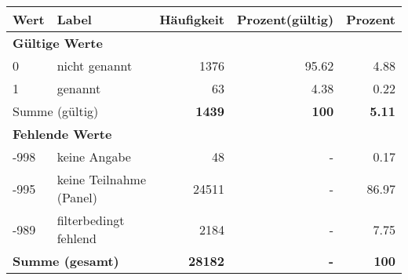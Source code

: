      \begin{longtable}{lXrrr}
     \toprule
     \textbf{Wert} & \textbf{Label} & \textbf{Häufigkeit} & \textbf{Prozent(gültig)} & \textbf{Prozent} \\
     \endhead
     \midrule
     \multicolumn{5}{l}{\textbf{Gültige Werte}}\\

     0 &
     \multicolumn{1}{X}{ nicht genannt   } &


       \num{1376} &
       \num[round-mode=places,round-precision=2]{95,62} &
         \num[round-mode=places,round-precision=2]{4,88} \\

     1 &
     \multicolumn{1}{X}{ genannt   } &


       \num{63} &
       \num[round-mode=places,round-precision=2]{4,38} &
         \num[round-mode=places,round-precision=2]{0,22} \\
     \midrule
     \multicolumn{2}{l}{Summe (gültig)} &
       \textbf{\num{1439}} &
     \textbf{100} &
       \textbf{\num[round-mode=places,round-precision=2]{5,11}} \\
     \multicolumn{5}{l}{\textbf{Fehlende Werte}}\\
       -998 &
       keine Angabe &
         \num{48} &
        - &
         \num[round-mode=places,round-precision=2]{0,17} \\
       -995 &
       keine Teilnahme (Panel) &
         \num{24511} &
        - &
         \num[round-mode=places,round-precision=2]{86,97} \\
       -989 &
       filterbedingt fehlend &
         \num{2184} &
        - &
         \num[round-mode=places,round-precision=2]{7,75} \\
     \midrule
     \multicolumn{2}{l}{\textbf{Summe (gesamt)}} &
          \textbf{\num{28182}} &
        \textbf{-} &
        \textbf{100} \\
     \bottomrule
     \end{longtable}
     
